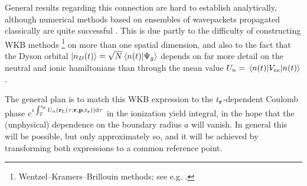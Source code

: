 General results regarding this connection are hard to establish analytically, although numerical methods based on ensembles of wavepackets propagated classically are quite successful \cite{Tannor_time_dependent_QM}. This is due partly to the difficulty of constructing WKB methods%
\footnote{Wentzel–Kramers–Brillouin methods; see e.g. .}
on more than one spatial dimension, and also to the fact that the Dyson orbital $\ket{n_D(t)}=\sqrt{N}\braket{n(t)}{\Psi_g}$ depends on far more detail on the neutral and ionic hamiltonians than through the mean value $U_n=\matrixel{n(t)}{V_{ee}}{n(t)}$. 

The general plan is to match this WKB expression to the ${t_{\vb{r}}}$-dependent Coulomb phase $e^{i\int_T^{{t_{\vb{r}}}} U_n(\vb{r}_\mathrm{L}(\tau;\vb{r},\vb{p},{t_{\vb{r}}}))\mathrm{d}\tau}$ in the ionization yield integral, in the hope that the (unphysical) dependence on the boundary radius $a$ will vanish. In general this will be possible, but only approximately so, and it will be achieved by transforming both expressions to a common reference point.

